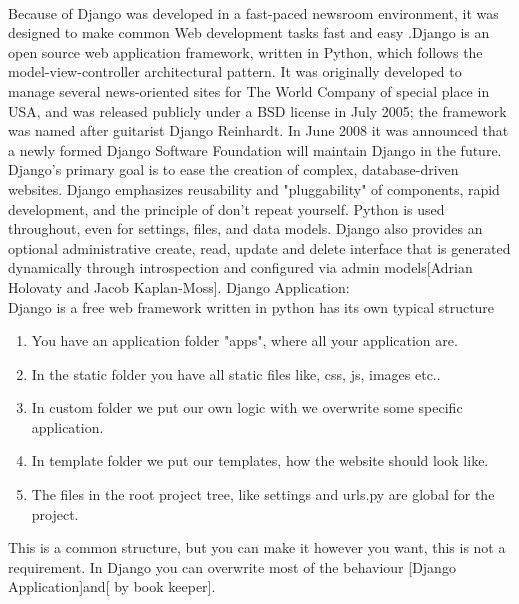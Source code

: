 \documentclass[12pt,a4paper,class,twoside,openany]{report}
\begin{document}
 \paragraph*{\hspace{.9 cm} } Because of Django was developed in a fast-paced newsroom environment, it was designed to make common Web development tasks fast and easy .Django is an open source web application framework, written in Python, which follows the model-view-controller architectural pattern. It was originally developed to manage several news-oriented sites for The World Company of special place in USA, and was released publicly under a BSD license in July 2005; the framework was named after guitarist Django Reinhardt. In June 2008 it was announced that a newly formed Django Software Foundation will maintain Django in the future.
Django's primary goal is to ease the creation of complex, database-driven websites. Django emphasizes reusability and "pluggability" of components, rapid development, and the principle of don't repeat yourself. Python is used throughout, even for settings, files, and data models. Django also provides an optional administrative create, read, update and delete interface that is generated dynamically through introspection and configured via admin models[Adrian Holovaty and  Jacob Kaplan-Moss].
 Django Application:
\\ Django is a free web framework written in python has its own typical structure
\begin{enumerate}
\item You have an application folder "apps", where all your application are.
\item In the static folder you have all static files like, css, js, images etc..
\item In custom folder we put our own logic with we overwrite some specific application.
\item In template folder we put our templates, how the website should look like.
\item The files in the root project tree, like settings and urls.py are global for the project.
\end{enumerate}
This is a common structure, but you can make it however you want, this is not a requirement. In Django you can overwrite most of the behaviour [Django Application]and[ by book keeper]. 
\end{document}
